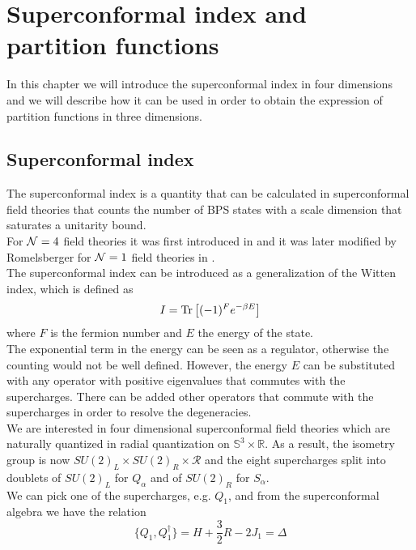 

\chapter{Superconformal index and partition functions}

In this chapter we will introduce the superconformal index in four dimensions and we will describe how it can be used in order to obtain the expression of partition functions in three dimensions.\\
{\color{red}{ \LARGE Devo Aggiunger qualcosa}}


\section{Superconformal index}
The superconformal index is a quantity that can be calculated in superconformal field theories that counts the number of BPS states with a scale dimension that saturates a unitarity bound.\\
For $\mathcal{N}=4$ field theories it was first introduced in \cite{Kinney:2005ej}
and it was later modified by Romelsberger for $\mathcal{N}=1$ field theories in \cite{Romelsberger:2005eg}.\\
The superconformal index can be introduced as a generalization of the Witten index, which is defined as 
\begin{equation}
I = \mathrm{Tr } \,{ \left[   (-1)^F e^{-\beta E}\right]}
\end{equation}
where $F$ is the fermion number and $E$ the energy of the state.\\
The exponential term in the energy can be seen as a regulator, otherwise the counting would not be well defined.
However, the energy $E$ can be substituted with any operator with positive eigenvalues that commutes with the supercharges. 
There can be added other operators that commute with the supercharges in order to resolve the degeneracies.
\\
We are interested in four dimensional superconformal field theories which are naturally quantized in radial quantization on $\mathbb{S}^3 \times \mathbb{R}$. 
As a result, the isometry group is now $SU(2)_L \times SU(2)_R \times \mathcal{R}$ and the eight supercharges split into doublets of $SU(2)_L$ for $Q_{\alpha}$ and of $SU(2)_R$ for $S_{\alpha}$.\\
We can pick one of the supercharges, e.g. $Q_1$, and from the superconformal algebra we have the relation
\begin{equation}
 \{Q_1, Q_1^{\dagger} \} = H + \frac{3}{2} R - 2 J_1 = \Delta
 \end{equation} 
